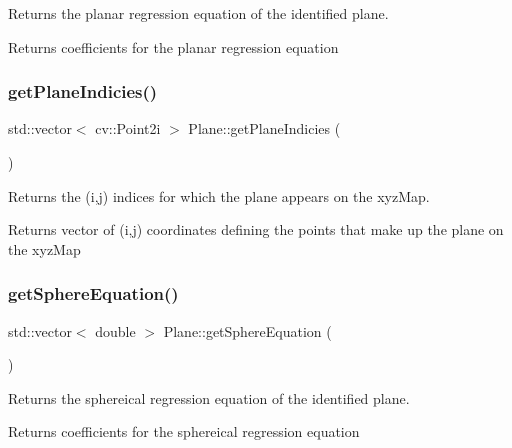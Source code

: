 Returns the planar regression equation of the identified plane. 

\begin{DoxyReturn}{Returns}
coefficients for the planar regression equation 
\end{DoxyReturn}
\hypertarget{class_plane_a843717e035e2e6b4e03a8eece14098b1}{}\label{class_plane_a843717e035e2e6b4e03a8eece14098b1} 
\subsubsection{\texorpdfstring{get\+Plane\+Indicies()}{getPlaneIndicies()}}
{\footnotesize\ttfamily std\+::vector$<$ cv\+::\+Point2i $>$ Plane\+::get\+Plane\+Indicies (\begin{DoxyParamCaption}{ }\end{DoxyParamCaption})}



Returns the (i,j) indices for which the plane appears on the xyz\+Map. 

\begin{DoxyReturn}{Returns}
vector of (i,j) coordinates defining the points that make up the plane on the xyz\+Map 
\end{DoxyReturn}
\hypertarget{class_plane_ab82069a9be653b07a589374c03b2f436}{}\label{class_plane_ab82069a9be653b07a589374c03b2f436} 
\subsubsection{\texorpdfstring{get\+Sphere\+Equation()}{getSphereEquation()}}
{\footnotesize\ttfamily std\+::vector$<$ double $>$ Plane\+::get\+Sphere\+Equation (\begin{DoxyParamCaption}{ }\end{DoxyParamCaption})}



Returns the sphereical regression equation of the identified plane. 

\begin{DoxyReturn}{Returns}
coefficients for the sphereical regression equation 
\end{DoxyReturn}
\hypertarget{class_plane_acd72c8d01f393ef78c4ed1f685d1d36d}{}\label{class_plane_acd72c8d01f393ef78c4ed1f685d1d36d} 
